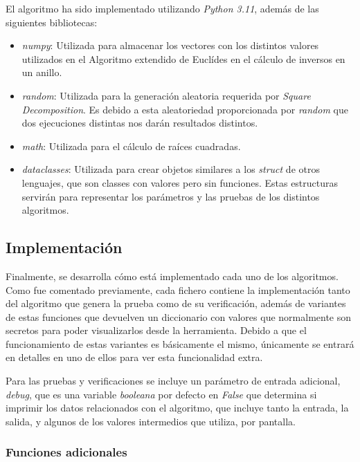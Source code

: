 El algoritmo ha sido implementado utilizando \emph{Python 3.11}, además de las siguientes bibliotecas:
\begin{itemize}
    \item \emph{numpy}: Utilizada para almacenar los vectores con los distintos valores utilizados en el Algoritmo extendido de Euclídes en el cálculo de inversos en un anillo.

    \item \emph{random}: Utilizada para la generación aleatoria requerida por \emph{Square Decomposition}. Es debido a esta aleatoriedad proporcionada por \emph{random} que dos ejecuciones distintas nos darán resultados distintos.

    \item \emph{math}: Utilizada para el cálculo de raíces cuadradas.

    \item \emph{dataclasses}: Utilizada para crear objetos similares a los \emph{struct} de otros lenguajes, que son classes con valores pero sin funciones. Estas estructuras servirán para representar los parámetros y las pruebas de los distintos algoritmos.
\end{itemize}

\subsection{Implementación}

Finalmente, se desarrolla cómo está implementado cada uno de los algoritmos. Como fue comentado previamente, cada fichero contiene la implementación tanto del algoritmo que genera la prueba como de su verificación, además de variantes de estas funciones que devuelven un diccionario con valores que normalmente son secretos para poder visualizarlos desde la herramienta. Debido a que el funcionamiento de estas variantes es básicamente el mismo, únicamente se entrará en detalles en uno de ellos para ver esta funcionalidad extra.

Para las pruebas y verificaciones se incluye un parámetro de entrada adicional, \textit{debug}, que es una variable \textit{booleana} por defecto en \textit{False} que determina si imprimir los datos relacionados con el algoritmo, que incluye tanto la entrada, la salida, y algunos de los valores intermedios que utiliza, por pantalla.

\subsubsection{Funciones adicionales}

